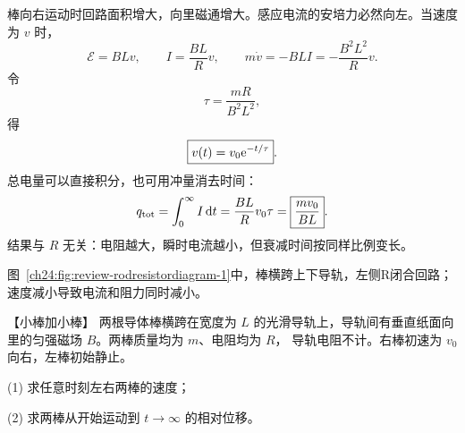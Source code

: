 {\begin{xesolution}
棒向右运动时回路面积增大，向里磁通增大。感应电流的安培力必然向左。当速度为 $v$ 时，
\begin{equation}
  \mathcal E=BLv,
  \qquad I=\frac{BL}{R}v,
  \qquad m\dot v=-BLI=-\frac{B^2L^2}{R}v.
\end{equation}
令
\begin{equation}
  \tau=\frac{mR}{B^2L^2},
\end{equation}
得
\begin{equation}
  \boxed{v(t)=v_0\mathrm e^{-t/\tau}}.
\end{equation}
总电量可以直接积分，也可用冲量消去时间：
\begin{equation}
  q_{\rm tot}=\int_0^\infty I\mathop{}\!\mathrm d t
  =\frac{BL}{R}v_0\tau
  =\boxed{\frac{mv_0}{BL}}.
\end{equation}
结果与 $R$ 无关：电阻越大，瞬时电流越小，但衰减时间按同样比例变长。

图~\ref{ch24:fig:review-rodresistordiagram-1}中，棒横跨上下导轨，左侧R闭合回路；速度减小导致电流和阻力同时减小。
\par\noindent\begin{minipage}{\linewidth}
\rodResistorDiagram
{}
\end{minipage}\par\medskip
\end{xesolution}



\begin{origexamplebox}{【小棒加小棒】}\label{ch24:ex:s40-9-4}
两根导体棒横跨在宽度为 $L$ 的光滑导轨上，导轨间有垂直纸面向里的匀强磁场 $B$。两棒质量均为 $m$、电阻均为 $R$，
导轨电阻不计。右棒初速为 $v_0$ 向右，左棒初始静止。

(1) 求任意时刻左右两棒的速度；

(2) 求两棒从开始运动到 $t\to\infty$ 的相对位移。

%
\begin{center}\end{center}
\end{origexamplebox}

}
